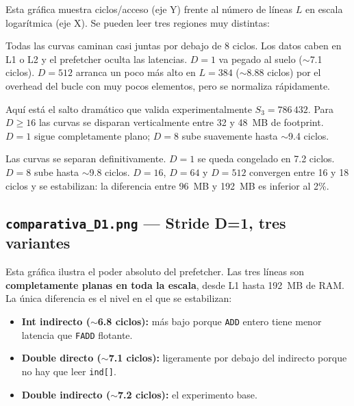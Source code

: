 \documentclass[12pt,a4paper]{article}
\begin{document}
Esta gráfica muestra ciclos/acceso (eje Y) frente al número de líneas $L$ en escala logarítmica (eje X). Se pueden leer tres regiones muy distintas:

\begin{description}[leftmargin=1.5em, itemsep=6pt]
  \item[\color{verde}Región plana izquierda ($L < 20\,480$):] Todas las curvas caminan casi juntas por debajo de 8 ciclos. Los datos caben en L1 o L2 y el prefetcher oculta las latencias. $D=1$ va pegado al suelo ($\sim$7.1 ciclos). $D=512$ arranca un poco más alto en $L=384$ ($\sim$8.88 ciclos) por el overhead del bucle con muy pocos elementos, pero se normaliza rápidamente.

  \item[\color{naranja}Región de transición ($524\,288 < L < 786\,432$):] Aquí está el salto dramático que valida experimentalmente $S_3=786\,432$. Para $D \geq 16$ las curvas se disparan verticalmente entre 32 y 48~MB de footprint. $D=1$ sigue completamente plano; $D=8$ sube suavemente hasta $\sim$9.4 ciclos.

  \item[\color{rojo}Región RAM ($L > 786\,432$):] Las curvas se separan definitivamente. $D=1$ se queda congelado en 7.2 ciclos. $D=8$ sube hasta $\sim$9.8 ciclos. $D=16$, $D=64$ y $D=512$ convergen entre 16 y 18 ciclos y se estabilizan: la diferencia entre 96~MB y 192~MB es inferior al 2\%.
\end{description}

\subsection{\texttt{comparativa\_D1.png} --- Stride D=1, tres variantes}

Esta gráfica ilustra el poder absoluto del prefetcher. Las tres líneas son \textbf{completamente planas en toda la escala}, desde L1 hasta 192~MB de RAM. La única diferencia es el nivel en el que se estabilizan:

\begin{itemize}[leftmargin=1.5em]
  \item \textbf{Int indirecto ($\sim$6.8 ciclos):} más bajo porque \texttt{ADD} entero tiene menor latencia que \texttt{FADD} flotante.
  \item \textbf{Double directo ($\sim$7.1 ciclos):} ligeramente por debajo del indirecto porque no hay que leer \texttt{ind[]}.
  \item \textbf{Double indirecto ($\sim$7.2 ciclos):} el experimento base.
\end{itemize}
\end{document}
